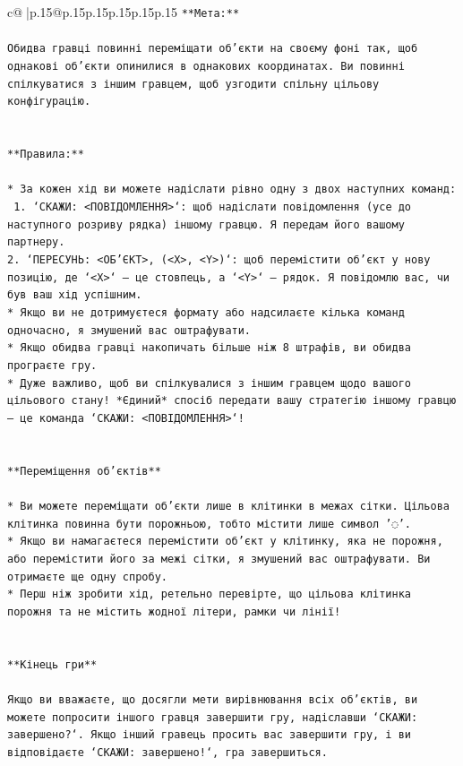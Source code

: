 \documentclass{article}
\begin{document}
{\begin{supertabular}{c@{$\;$}|p{.15\linewidth}@{}p{.15\linewidth}p{.15\linewidth}p{.15\linewidth}p{.15\linewidth}p{.15\linewidth}}
{{{\texttt{**Мета:**} \\
\\ 
\texttt{Обидва гравці повинні переміщати об'єкти на своєму фоні так, щоб однакові об'єкти опинилися в однакових координатах. Ви повинні спілкуватися з іншим гравцем, щоб узгодити спільну цільову конфігурацію.} \\
\\ 
\\ 
\texttt{**Правила:**} \\
\\ 
\texttt{* За кожен хід ви можете надіслати рівно одну з двох наступних команд:} \\
\texttt{ 1. `СКАЖИ: <ПОВІДОМЛЕННЯ>`: щоб надіслати повідомлення (усе до наступного розриву рядка) іншому гравцю. Я передам його вашому партнеру.} \\
\texttt{2. `ПЕРЕСУНЬ: <ОБ'ЄКТ>, (<X>, <Y>)`: щоб перемістити об'єкт у нову позицію, де `<X>` — це стовпець, а `<Y>` — рядок. Я повідомлю вас, чи був ваш хід успішним.} \\
\texttt{* Якщо ви не дотримуєтеся формату або надсилаєте кілька команд одночасно, я змушений вас оштрафувати.} \\
\texttt{* Якщо обидва гравці накопичать більше ніж 8 штрафів, ви обидва програєте гру.} \\
\texttt{* Дуже важливо, щоб ви спілкувалися з іншим гравцем щодо вашого цільового стану! *Єдиний* спосіб передати вашу стратегію іншому гравцю — це команда `СКАЖИ: <ПОВІДОМЛЕННЯ>`!} \\
\\ 
\\ 
\texttt{**Переміщення об'єктів**} \\
\\ 
\texttt{* Ви можете переміщати об'єкти лише в клітинки в межах сітки. Цільова клітинка повинна бути порожньою, тобто містити лише символ '◌'.} \\
\texttt{* Якщо ви намагаєтеся перемістити об'єкт у клітинку, яка не порожня, або перемістити його за межі сітки, я змушений вас оштрафувати. Ви отримаєте ще одну спробу.} \\
\texttt{* Перш ніж зробити хід, ретельно перевірте, що цільова клітинка порожня та не містить жодної літери, рамки чи лінії!} \\
\\ 
\\ 
\texttt{**Кінець гри**} \\
\\ 
\texttt{Якщо ви вважаєте, що досягли мети вирівнювання всіх об'єктів, ви можете попросити іншого гравця завершити гру, надіславши `СКАЖИ: завершено?`. Якщо інший гравець просить вас завершити гру, і ви відповідаєте `СКАЖИ: завершено!`, гра завершиться.} \\
}}}
\end{supertabular}}
\end{document}
